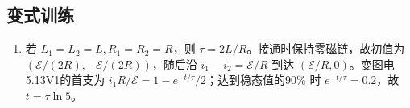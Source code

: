 \documentclass[UTF8,fontset=fandol,a4paper,11pt]{ctexart}
\begin{document}

\subsection*{变式训练}

\begin{enumerate}
\item 若 $L_1=L_2=L,R_1=R_2=R$，则 $\tau=2L/R$。接通时保持零磁链，故初值为 $(\mathcal E/(2R),-\mathcal E/(2R))$，随后沿 $i_1-i_2=\mathcal E/R$ 到达 $(\mathcal E/R,0)$。变图电5.13V1的首支为 $i_1R/\mathcal E=1-e^{-t/\tau}/2$；达到稳态值的90\% 时 $e^{-t/\tau}=0.2$，故 $t=\tau\ln5$。
\begin{center}\begin{minipage}{.98\linewidth}\centering
\begin{tikzpicture}[scale=.85,transform shape]

\end{tikzpicture}
\end{minipage}
\end{center}
\end{enumerate}
\end{document}
